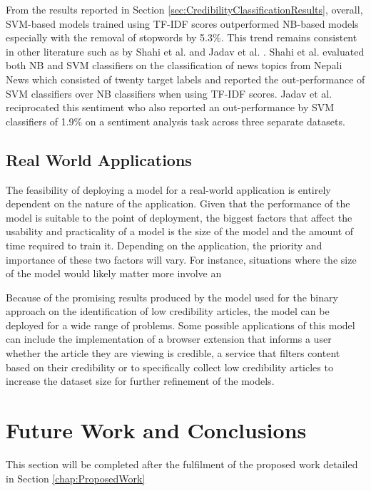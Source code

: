 \documentclass[a4paper,twoside,phd]{BYUPhys}
\begin{document}
From the results reported in Section \ref{sec:CredibilityClassificationResults}, overall, SVM-based models trained using TF-IDF scores outperformed NB-based models especially with the removal of stopwords by 5.3\%. This trend remains consistent in other literature such as by Shahi et al. \cite{Shahi2018} and Jadav et al. \cite{Jadav2016}. Shahi et al. evaluated both NB and SVM classifiers on the classification of news topics from Nepali News which consisted of twenty target labels and reported the out-performance of SVM classifiers over NB classifiers when using TF-IDF scores. Jadav et al. reciprocated this sentiment who also reported an out-performance by SVM classifiers of 1.9\% on a sentiment analysis task across three separate datasets. 



\section{Real World Applications}
\label{sec:RealWorldApplication}

The feasibility of deploying a model for a real-world application is entirely dependent on the nature of the application. Given that the performance of the model is suitable to the point of deployment, the biggest factors that affect the usability and practicality of a model is the size of the model and the amount of time required to train it. Depending on the application, the priority and importance of these two factors will vary. For instance, situations where the size of the model would likely matter more involve an \newline



Because of the promising results produced by the model used for the binary approach on the identification of low credibility articles, the model can be deployed for a wide range of problems. Some possible applications of this model can include the implementation of a browser extension that informs a user whether the article they are viewing is credible, a service that filters content based on their credibility or to specifically collect low credibility articles to increase the dataset size for further refinement of the models.

\chapter{Future Work and Conclusions}
\label{chap:Conclusions}
This section will be completed after the fulfilment of the proposed work detailed in Section \ref{chap:ProposedWork}
\end{document}
